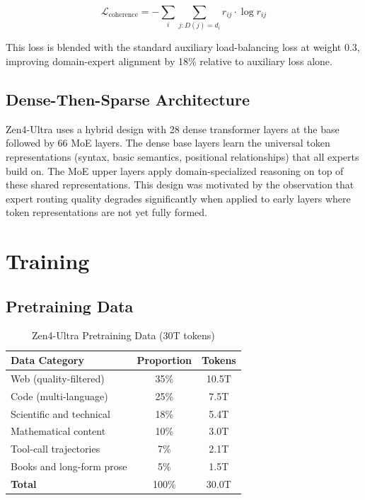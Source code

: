 \documentclass[11pt,a4paper]{article}
\begin{document}
\begin{equation}
\mathcal{L}_{\text{coherence}} = -\sum_{i} \sum_{j: D(j) = d_i} r_{ij} \cdot \log r_{ij}
\end{equation}

This loss is blended with the standard auxiliary load-balancing loss at weight 0.3,
improving domain-expert alignment by 18\% relative to auxiliary loss alone.

\subsection{Dense-Then-Sparse Architecture}

Zen4-Ultra uses a hybrid design with 28 dense transformer layers at the base followed by
66 MoE layers. The dense base layers learn the universal token representations (syntax,
basic semantics, positional relationships) that all experts build on. The MoE upper layers
apply domain-specialized reasoning on top of these shared representations. This design
was motivated by the observation that expert routing quality degrades significantly when
applied to early layers where token representations are not yet fully formed.

\section{Training}

\subsection{Pretraining Data}

\begin{table}[H]
\centering
\begin{tabular}{lcc}
\toprule
\textbf{Data Category} & \textbf{Proportion} & \textbf{Tokens} \\
\midrule
Web (quality-filtered)         & 35\%  & 10.5T \\
Code (multi-language)          & 25\%  & 7.5T \\
Scientific and technical       & 18\%  & 5.4T \\
Mathematical content           & 10\%  & 3.0T \\
Tool-call trajectories         & 7\%   & 2.1T \\
Books and long-form prose      & 5\%   & 1.5T \\
\midrule
\textbf{Total}                 & 100\% & 30.0T \\
\bottomrule
\end{tabular}
\caption{Zen4-Ultra Pretraining Data (30T tokens)}
\end{table}
\end{document}
